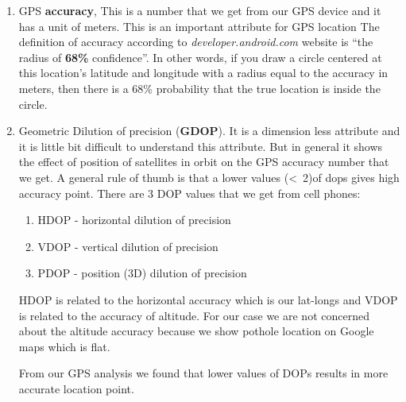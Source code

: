 \documentclass[12pt]{report}
\begin{document}


\begin{enumerate}
\item GPS \textbf{accuracy}, This is a number that we get from our GPS device
  and it has a unit of meters. This is an important attribute for GPS location
  The definition of accuracy according to \textit{developer.android.com} website
  is ``the radius of \textbf{68\%} confidence''. In other words, if you draw a
  circle centered at this location's latitude and longitude with a radius equal
  to the accuracy in meters, then there is a 68\% probability that the true
  location is inside the circle.

\item Geometric Dilution of precision (\textbf{GDOP}). It is a dimension less
  attribute and it is little bit difficult to understand this attribute. But in
  general it shows the effect of position of satellites in orbit on the GPS
  accuracy number that we get. A general rule of thumb is that a lower values
  (\textless \ 2)of dops gives high accuracy point. There are 3 DOP values that we
  get from cell phones:
  \begin{enumerate}
  \item HDOP - horizontal dilution of precision
  \item VDOP - vertical dilution of precision
  \item PDOP - position (3D) dilution of precision
  \end{enumerate}

  HDOP is related to the horizontal accuracy which is our lat-longs and VDOP is
  related to the accuracy of altitude. For our case we are not concerned about
  the altitude accuracy because we show pothole location on Google maps which is
  flat.

  From our GPS analysis we found that lower values of DOPs results in more
  accurate location point.

\end{enumerate}
\end{document}
